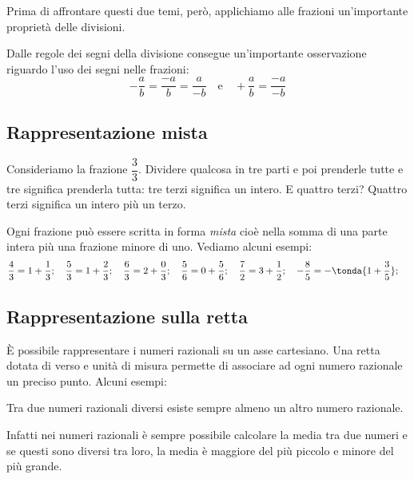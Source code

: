 Prima di affrontare questi due temi, però, applichiamo alle frazioni 
un'importante proprietà delle divisioni.

\begin{osservazione}
 Dalle regole dei segni della divisione consegue un'importante osservazione 
riguardo l'uso dei segni nelle frazioni:
\[-\dfrac{a}{b} = \dfrac{-a}{b} = \dfrac{a}{-b} \quad \text{e} \quad
  +\dfrac{a}{b} = \dfrac{-a}{-b}
\]
\end{osservazione}

\subsection{Rappresentazione mista}
\label{sub:razionali_rappresentazione_mista}

Consideriamo la frazione \(\dfrac{3}{3}\). Dividere qualcosa in tre parti e 
poi prenderle tutte e tre significa prenderla tutta: tre terzi significa 
un intero. E quattro terzi? Quattro terzi significa un intero più un terzo.

Ogni frazione può essere scritta in forma \emph{mista} cioè nella somma di 
una parte intera più una frazione minore di uno. Vediamo alcuni esempi:
\[\frac{4}{3} = 1 + \frac{1}{3}; \quad
\frac{5}{3} = 1 + \frac{2}{3}; \quad
\frac{6}{3} = 2 + \frac{0}{3}; \quad
\frac{5}{6} = 0 + \frac{5}{6}; \quad
\frac{7}{2} = 3 + \frac{1}{2}; \quad
-\frac{8}{5} = -\tonda{1 + \frac{3}{5}}; \quad
\]

\subsection{Rappresentazione sulla retta}
\label{sub:razionali_rappresentazione_retta}

È possibile rappresentare i numeri razionali su un asse cartesiano. Una 
retta dotata di verso e unità di misura permette di associare ad ogni 
numero razionale un preciso punto. Alcuni esempi:

\begin{center}
 \rettafra
\end{center}

\begin{teorema}
 Tra due numeri razionali diversi esiste sempre almeno un altro numero 
razionale.
\end{teorema}

Infatti nei numeri razionali è sempre possibile calcolare la media tra due 
numeri e se questi sono diversi tra loro, la media è maggiore del più 
piccolo e minore del più grande.

